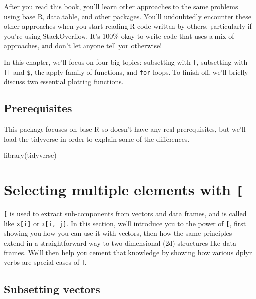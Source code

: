 \documentclass[
  letterpaper,
  DIV=11,
  numbers=noendperiod]{scrreprt}
\newenvironment{Shaded}{\begin{snugshade}}{\end{snugshade}}
\newcommand{\FunctionTok}[1]{\textcolor[rgb]{0.28,0.35,0.67}{#1}}
\newcommand{\NormalTok}[1]{\textcolor[rgb]{0.00,0.23,0.31}{#1}}
\begin{document}
After you read this book, you'll learn other approaches to the same
problems using base R, data.table, and other packages. You'll
undoubtedly encounter these other approaches when you start reading R
code written by others, particularly if you're using StackOverflow. It's
100\% okay to write code that uses a mix of approaches, and don't let
anyone tell you otherwise!

In this chapter, we'll focus on four big topics: subsetting with
\texttt{{[}}, subsetting with \texttt{{[}{[}} and \texttt{\$}, the apply
family of functions, and \texttt{for} loops. To finish off, we'll
briefly discuss two essential plotting functions.

\hypertarget{prerequisites}{%
\subsection{Prerequisites}\label{prerequisites}}

This package focuses on base R so doesn't have any real prerequisites,
but we'll load the tidyverse in order to explain some of the
differences.

\begin{Shaded}
\begin{Highlighting}[]
\FunctionTok{library}\NormalTok{(tidyverse)}
\end{Highlighting}
\end{Shaded}

\hypertarget{sec-subset-many}{%
\section{\texorpdfstring{Selecting multiple elements with
\texttt{{[}}}{Selecting multiple elements with {[}}}\label{sec-subset-many}}

\texttt{{[}} is used to extract sub-components from vectors and data
frames, and is called like \texttt{x{[}i{]}} or \texttt{x{[}i,\ j{]}}.
In this section, we'll introduce you to the power of \texttt{{[}}, first
showing you how you can use it with vectors, then how the same
principles extend in a straightforward way to two-dimensional (2d)
structures like data frames. We'll then help you cement that knowledge
by showing how various dplyr verbs are special cases of \texttt{{[}}.

\hypertarget{subsetting-vectors}{%
\subsection{Subsetting vectors}\label{subsetting-vectors}}
\end{document}
